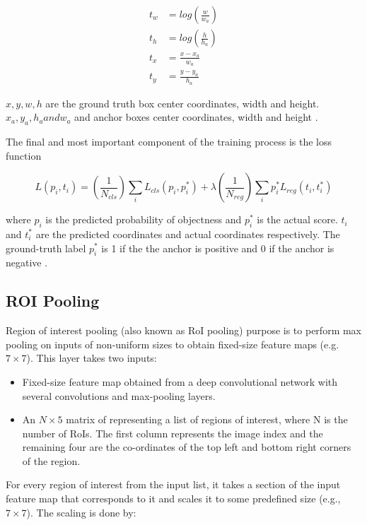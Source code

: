 \begin{align}
  t_{w} &= log(\frac{w}{w_{a}}) \\
  t_{h} &= log(\frac{h}{h_{a}}) \\
  t_{x} &= \frac{x - x_{a}}{w_{a}} \\
  t_{y} &= \frac{y - y_{a}}{h_{a}}
\end{align}

$x, y , w, h$ are the ground truth box center coordinates, width and height. $x_{a}, y_{a}, h_{a} and w_{a}$ and anchor boxes center coordinates, width and height \cite{b1}.

The final and most important component of the training process is the loss function

\begin{equation}
  L(p_{i},t_{i}) = (\frac{1}{N_{cls}}) \sum_{i}^{} L_{cls}(p_{i},p_{i}^{*}) + \lambda (\frac{1}{N_{reg}}) \sum_{i}^{} p_{i}^{*} L_{reg}(t_{i},t_{i}^{*})
\end{equation}

where $p_{i}$ is the predicted probability of objectness and $p_{i}^*$ is the actual score. $t_{i}$ and $t_{i}^*$ are the predicted coordinates and actual coordinates respectively. The ground-truth label $p_{i}^*$ is 1 if the the anchor is positive and 0 if the anchor is negative \cite{b1}.

\subsection{ROI Pooling}
Region of interest pooling (also known as RoI pooling) purpose is to perform max pooling on inputs of non-uniform sizes to obtain fixed-size feature maps (e.g. $7 \times 7$). This layer takes two inputs:

\begin{itemize}
	\item Fixed-size feature map obtained from a deep convolutional network with several convolutions and max-pooling layers.
	\item An $N \times 5$ matrix of representing a list of regions of interest, where N is the number of RoIs. The first column represents the image index and the remaining four are the co-ordinates of the top left and bottom right corners of the region.
\end{itemize}

For every region of interest from the input list, it takes a section of the input feature map that corresponds to it and scales it to some predefined size (e.g., $7 \times 7$). The scaling is done by:

